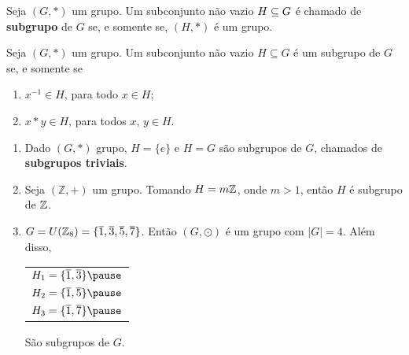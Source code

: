 \documentclass{beamer}
\begin{document}
    \begin{frame}
        \begin{definicao}
            Seja $(G,*)$ um grupo. \pause Um subconjunto não vazio \pause $H\subseteq G$ \pause é chamado de \textbf{subgrupo} de $G$ \pause se, e somente se, $(H,*)$ \pause é um grupo.\pause
        \end{definicao}

        \begin{proposicao}
            Seja $(G, \ast )$ um grupo. \pause Um subconjunto não vazio \pause $H\subseteq G$ é um subgrupo de $G$ \pause se, e somente se\pause
            \begin{enumerate}[label={\roman*})]
                \item\label{subgrupo_condicao_1} $x^{-1}\in H$, \pause para todo $x \in H$;
                \item\label{subgrupo_condicao_2} $x*y\in H$, \pause para todos $x$, $y \in H$.\pause
            \end{enumerate}
        \end{proposicao}
    \end{frame}

    \begin{frame}
        \begin{exemplos}
            \begin{enumerate}[label={\roman*})]
                \item Dado $(G,*)$ grupo, \pause $H=\{e\}$ \pause e $H=G$ \pause são subgrupos de $G$, \pause chamados de \textbf{subgrupos triviais}.\pause

                \item Seja $(\mathbb{Z},+)$ um grupo. \pause Tomando $H = m\mathbb{Z}$, \pause onde $m > 1$, então $H$ é subgrupo de $\mathbb{Z}$.\pause

                \item $G = U(\mathbb{Z}_8) = \{\overline{1}, \overline{3}, \overline{5}, \overline{7}\}$. \pause Então $(G,\odot)$ é um grupo \pause com $|G| = 4$. \pause Além disso,\pause
                \begin{center}
                    \begin{tabular}{l}
                        $H_1 = \{\overline{1}, \overline{3}\}\pause$\\
                        $H_2 = \{\overline{1}, \overline{5}\}\pause$\\
                        $H_3 = \{\overline{1}, \overline{7}\}\pause$
                    \end{tabular}
                \end{center}
                São subgrupos de $G$.
                \seti
            \end{enumerate}
        \end{exemplos}
    \end{frame}
\end{document}
